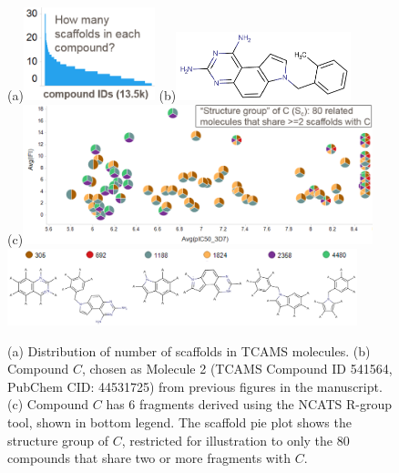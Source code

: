 \documentclass[11pt,letterpaper,biochem]{article}
\begin{document}
\begin{figure}
\centering
  (a)\includegraphics[width=1.5in]{../fig/howmany_scaf.png}
(b)\includegraphics[width=2in]{../fig/tcam2_mol_541564_v2.png}\\
\vspace{0.1in}
  (c)\includegraphics[width=4in]{../fig/structure_group_C_v2.png}\\
  \includegraphics[width=4in]{../fig/tcam2_541564_6scaf_row_v2.png}
  \caption{
    (a) Distribution of number of scaffolds in TCAMS molecules. (b) Compound $C$, chosen as Molecule 2 (TCAMS Compound ID 541564, PubChem CID: 44531725) from previous figures in the manuscript.
    (c) Compound $C$ has 6 fragments derived using the NCATS R-group tool, shown in bottom legend. The scaffold pie plot shows the structure group of $C$, restricted for illustration to only the 80 compounds that share two or more fragments with $C$.} %
    \label{fig:strucgroup}
\end{figure}
\end{document}
